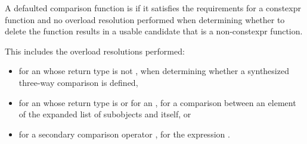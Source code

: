 \pnum
A defaulted comparison function is
%
if it
satisfies the requirements for a constexpr function and
no overload resolution
performed when determining whether to delete the function
results in a usable candidate that is a non-constexpr function.
\begin{note}
This includes the overload resolutions performed:

\begin{itemize}
\item
for an  whose return type is not ,
when determining whether a synthesized three-way comparison is defined,

\item
for an  whose return type is  or
for an ,
for a comparison between an element of the expanded list of
subobjects and itself, or

\item
for a secondary comparison operator ,
for the expression .
\end{itemize}
\end{note}

